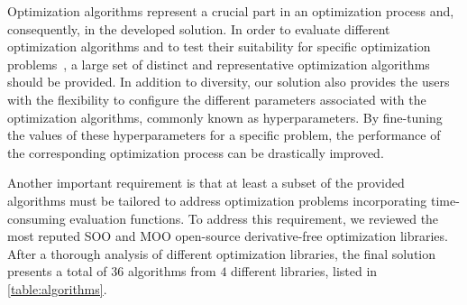 Optimization algorithms represent a crucial part in an optimization process and, consequently, in the developed solution. In order to evaluate different optimization algorithms and to test their suitability for specific optimization problems~\cite{Wolpert1997NFLT}, a large set of distinct and representative optimization algorithms should be provided. In addition to diversity, our solution also provides the users with the flexibility to configure the different parameters associated with the optimization algorithms, commonly known as hyperparameters. By fine-tuning the values of these hyperparameters for a specific problem, the performance of the corresponding optimization process can be drastically improved. 

Another important requirement is that at least a subset of the provided algorithms must be tailored to address optimization problems incorporating time-consuming evaluation functions. %
To address this requirement, we reviewed the most reputed \ac{SOO} and \ac{MOO} open-source derivative-free optimization libraries. After a thorough analysis of different optimization libraries, the final solution presents a total of $36$ algorithms from $4$ different libraries, listed in \cref{table:algorithms}. 

